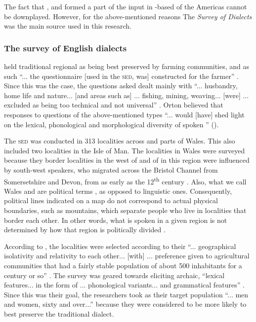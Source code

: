 The fact that  ,   and    formed a part of the input in -based  of the Americas \citep{Mufwene01, Smith87} cannot be downplayed. However, for the above-mentioned reasons The \emph{Survey of  Dialects} was the main  source used in this research.

\subsubsection{The survey of English dialects} \label{3.2.2.1}
\citet{Orton62} held traditional regional   as being best preserved by farming communities, and as such ``... the questionnaire [used in the \textsc{sed}, was] constructed for the farmer''  \citep[44]{Orton62}. Since this was the case, the questions asked dealt mainly with ``... husbandry, home life and nature... [and areas such as] ... fishing, mining, weaving... [were] ... excluded as being too technical and not universal'' \citep[44]{Orton62}. Orton believed that responses to questions of the above-mentioned types ``... would [have] shed light on the lexical, phonological and morphological diversity of spoken '' (\citeauthor{lavc09}).

The \textsc{sed} was conducted in 313 localities across  and parts of Wales. This also included two localities in the Isle of Man. The localities in Wales were surveyed because they border localities in the west of  \citep{Orton6271} and  of   in this region were influenced by south-west   speakers, who migrated across the Bristol Channel from Somersetshire and Devon, from as early as the 12\textsuperscript{th} century \citep{Penhallurick04}. Also, what we call Wales and  are political terms \citep{Nicholas72}, as opposed to linguistic ones. Consequently, political lines indicated on a map do not correspond to actual physical boundaries, such as mountains, which separate people who live in localities that border each other. In other words, what is spoken in a given region is not determined by how that region is politically divided \citep{Orton6271}.

According to \citet{Orton62}, the localities were selected according to their ``... geographical isolativity and relativity to each other... [with] ... preference given to agricultural communities that had a fairly stable population of about 500 inhabitants for a century or so'' \citep[15]{Orton62}. The survey was geared towards eliciting archaic, ``lexical features... in the form of ... phonological variants... and grammatical features'' \citep[45]{Orton62}. Since this was their goal, the researchers took as their target population ``... men and wom\-en, sixty and over...'' \citep[45]{Orton62} because they were considered to be more likely to best preserve the traditional dialect.

